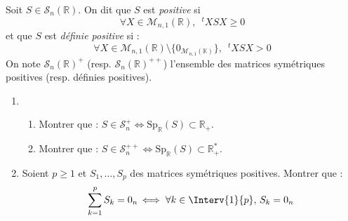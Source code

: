 \documentclass[a4paper,10pt]{report}
\begin{document}
\begin{Exercice}{} Soit $S \in \mathcal{S}_n(\mathbb{R})$. On dit que $S$ est \textit{positive} si
$$ \forall X \in \mathcal{M}_{n,1}(\mathbb{R}), \; ~^tX S X \geq 0$$
et que $S$ est \textit{définie positive} si :
$$ \forall X \in \mathcal{M}_{n,1}(\mathbb{R}) \setminus \lbrace 0_{\mathcal{M}_{n,1}(\mathbb{K})} \rbrace, \; ~^tX S X > 0$$
On note $\mathcal{S}_n(\mathbb{R})^+$ (resp. $\mathcal{S}_n(\mathbb{R})^{++}$) l'ensemble des matrices symétriques positives (resp. définies positives).

\begin{enumerate}
\item 
\begin{enumerate}
\item Montrer que : $S \in \mathcal{S}_n^+ \Longleftrightarrow \textrm{Sp}_{\mathbb{R}}(S) \subset \mathbb{R}_+$.
\item Montrer que : $S \in \mathcal{S}_n^{++} \Longleftrightarrow \textrm{Sp}_{\mathbb{R}}(S) \subset \mathbb{R}_+^{*}$.
\end{enumerate}
\item Soient $p \geq 1$ et $S_1, \ldots, S_p$ des matrices symétriques positives. Montrer que :
$$ \sum_{k=1}^p S_k = 0_n  \, \Longleftrightarrow \;  \forall k \in \Interv{1}{p}, \, S_k = 0_n $$
\end{enumerate}
\end{Exercice}

\corr 
\end{document}

